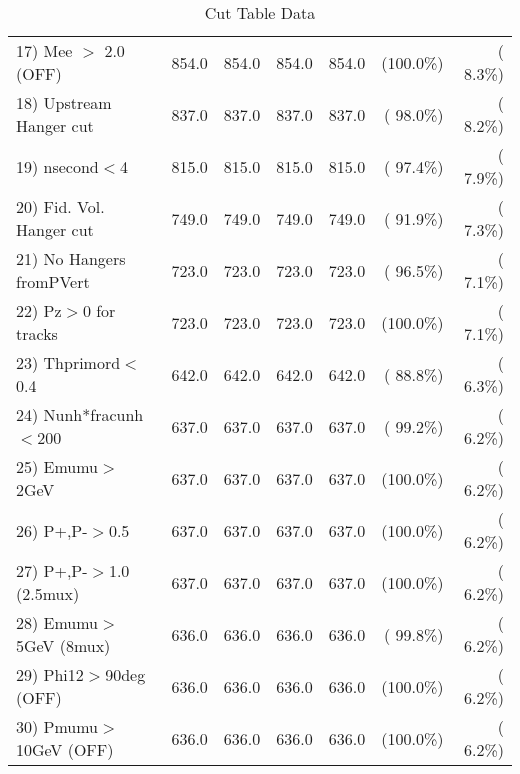 \begin{table}[h!]
\begin{tabular}{||l||r|r|r|r|r|r||}
 17) Mee $>$ 2.0  (OFF)   &        854.0 &        854.0 &        854.0 &        854.0 & (100.0\%) & (  8.3\%) \\
 18) Upstream Hanger cut  &        837.0 &        837.0 &        837.0 &        837.0 & ( 98.0\%) & (  8.2\%) \\
 19) nsecond$<$4          &        815.0 &        815.0 &        815.0 &        815.0 & ( 97.4\%) & (  7.9\%) \\
 20) Fid. Vol. Hanger cut &        749.0 &        749.0 &        749.0 &        749.0 & ( 91.9\%) & (  7.3\%) \\
 21) No Hangers fromPVert &        723.0 &        723.0 &        723.0 &        723.0 & ( 96.5\%) & (  7.1\%) \\
 22) Pz$>$0 for tracks    &        723.0 &        723.0 &        723.0 &        723.0 & (100.0\%) & (  7.1\%) \\
 23) Thprimord$<$0.4      &        642.0 &        642.0 &        642.0 &        642.0 & ( 88.8\%) & (  6.3\%) \\
 24) Nunh*fracunh$<$200   &        637.0 &        637.0 &        637.0 &        637.0 & ( 99.2\%) & (  6.2\%) \\
 25) Emumu$>$2GeV         &        637.0 &        637.0 &        637.0 &        637.0 & (100.0\%) & (  6.2\%) \\
 26) P+,P-$>$0.5          &        637.0 &        637.0 &        637.0 &        637.0 & (100.0\%) & (  6.2\%) \\
 27) P+,P-$>$1.0 (2.5mux) &        637.0 &        637.0 &        637.0 &        637.0 & (100.0\%) & (  6.2\%) \\
 28) Emumu$>$5GeV  (8mux) &        636.0 &        636.0 &        636.0 &        636.0 & ( 99.8\%) & (  6.2\%) \\
 29) Phi12$>$90deg  (OFF) &        636.0 &        636.0 &        636.0 &        636.0 & (100.0\%) & (  6.2\%) \\
 30) Pmumu$>$10GeV  (OFF) &        636.0 &        636.0 &        636.0 &        636.0 & (100.0\%) & (  6.2\%) \\
 \hline
 \hline
 \end{tabular}
 \caption{Cut Table  Data     }
 \label{tab-cutcohjpsi-mumu_data}
 \end{table}
